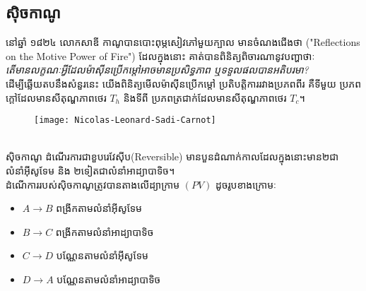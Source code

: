 \subsection{សុិចកាណូ}
\begin{biography}
	\begin{minipage}[l]{.6\textwidth}
		នៅឆ្នាំ ១៨២៤  លោកសាឌី កាណូបានបោះពុម្ភសៀវភៅមួយក្បាល មានចំណងជើងថា {\en("Reflections on the Motive Power of Fire")} ដែលក្នុងនោះ គាត់បានពិនិត្យពិចារណានូវបញ្ហាថាៈ\\
		\textit{តើមានលក្ខណៈអ្វីដែលម៉ាសុីនប្រើកម្តៅអាចមានប្រសិទ្ធភាព ឬទទួលផលបានអតិបរមា?}\\
		ដើម្បីឆ្លើយតបនឹងសំនួរនេះ យើងពិនិត្យមើលម៉ាសុីនប្រើកម្តៅ ប្រតិបត្តិការរវាងប្រភពពីរ គឺទីមួយ ប្រភពក្តៅដែលមានសីតុណ្ហភាពថេរ $T_{h}$ និងទីពី ប្រភពត្រជាក់ដែលមានសីតុណ្ហភាពថេរ $T_{c}$។
	\end{minipage}
	\begin{minipage}[r]{.5\textwidth}
		\begin{figure}[H]
			\centering
			\texttt{[image: Nicolas-Leonard-Sadi-Carnot]}\\
			\\
		\end{figure}
	\end{minipage}
\end{biography}
សុិចកាណូ ដំណើរការជាខួបរេវែសុីប{\en(Reversible)} មានបួនដំណាក់កាលដែលក្នុងនោះមាន២ជាលំនាំអុីសូទែម និង ២ទៀតជាលំនាំអាដ្យាបាទិច។\\
ដំណើការរបស់សុិចកាណូត្រូវបានតាងលើដ្យាក្រាម $\left(PV\right)$ ដូចរូបខាងក្រោមៈ\\
	\begin{minipage}[l]{.5\textwidth}
		\begin{itemize}
			\item $A\rightarrow B$ ពង្រីកតាមលំនាំអុីសូទែម
			\item $B\rightarrow C$ ពង្រីកតាមលំនាំអាដ្យាបាទិច
			\item $C\rightarrow D$ បណ្ណែនតាមលំនាំអុីសូទែម
			\item $D\rightarrow A$ បណ្ណែនតាមលំនាំអាដ្យាបាទិច
		\end{itemize}
	\end{minipage}
